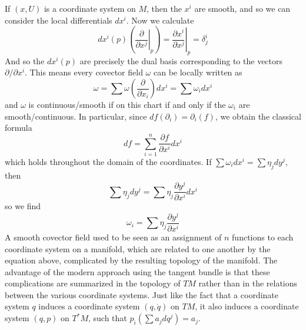 If $(x,U)$ is a coordinate system on $M$, then the $x^i$ are smooth, and so we can consider the local differentials $dx^i$. Now we calculate
%
\[ dx^i(p) \left( \left. \frac{\partial}{\partial x^j} \right|_p \right) = \left. \frac{\partial x^i}{\partial x^j} \right|_p = \delta^i_j \]
%
And so the $dx^i(p)$ are precisely the dual basis corresponding to the vectors $\partial/\partial x^i$. This means every covector field $\omega$ can be locally written as
%
\[ \omega = \sum \omega \left( \frac{\partial}{\partial x_i} \right) dx^i = \sum \omega_i dx^i \]
%
and $\omega$ is continuous/smooth if on this chart if and only if the $\omega_i$ are smooth/continuous. In particular, since $df(\partial_i) = \partial_i(f)$, we obtain the classical formula
%
\[ df = \sum_{i = 1}^n \frac{\partial f}{\partial x^i} dx^i \]
%
which holds throughout the domain of the coordinates. If $\sum \omega_i dx^i = \sum \eta_j dy^j$, then
%
\[ \sum \eta_j dy^j = \sum \eta_j \frac{\partial y^j}{\partial x^i} dx^i \]
%
so we find
%
\[ \omega_i = \sum \eta_j \frac{\partial y^j}{\partial x^i} \]
%
A smooth covector field used to be seen as an assignment of $n$ functions to each coordinate system on a manifold, which are related to one another by the equation above, complicated by the resulting topology of the manifold. The advantage of the modern approach using the tangent bundle is that these complications are summarized in the topology of $TM$ rather than in the relations between the various coordinate systems. Just like the fact that a coordinate system $q$ induces a coordinate system $(q,\dot{q})$ on $TM$, it also induces a coordinate system $(q,p)$ on $T^*M$, such that $p_i(\sum a_j dq^j) = a_j$.

